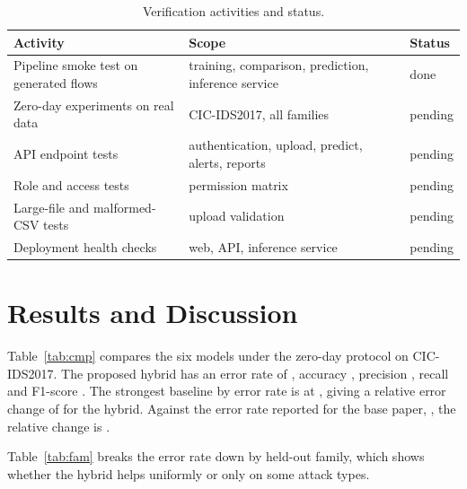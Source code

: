 \documentclass[conference]{IEEEtran}
\newcommand{\hybErr}{}\newcommand{\hybFscore}{}\newcommand{\hybPrec}{}\newcommand{\hybRec}{}\newcommand{\hybAcc}{}
\newcommand{\bestBaseName}{}\newcommand{\bestBaseErr}{}\newcommand{\relRedBase}{}\newcommand{\paperErr}{}\newcommand{\relRedPaper}{}
\begin{document}
\begin{table}[!htb]
\caption{Verification activities and status.}
\label{tab:test}
\centering\footnotesize
\begin{tabular}{@{}p{3.3cm}p{2.2cm}p{1.6cm}@{}}
\hline
Activity & Scope & Status \\
\hline
Pipeline smoke test on generated flows & training, comparison, prediction, inference service & done \\
Zero-day experiments on real data & CIC-IDS2017, all families & pending \\
API endpoint tests & authentication, upload, predict, alerts, reports & pending \\
Role and access tests & permission matrix & pending \\
Large-file and malformed-CSV tests & upload validation & pending \\
Deployment health checks & web, API, inference service & pending \\
\hline
\end{tabular}
\end{table}

\section{Results and Discussion}
Table~\ref{tab:cmp} compares the six models under the zero-day protocol on CIC-IDS2017. The proposed hybrid has an error rate of \hybErr{}, accuracy \hybAcc{}, precision \hybPrec{}, recall \hybRec{} and F1-score \hybFscore{}. The strongest baseline by error rate is \bestBaseName{} at \bestBaseErr{}, giving a relative error change of \relRedBase{} for the hybrid. Against the error rate reported for the base paper, \paperErr{}, the relative change is \relRedPaper{}.

\begin{table}[!htb]
\caption{Zero-day comparison on CIC-IDS2017 (mean over held-out attack families; best value in bold).}
\label{tab:cmp}
\centering\footnotesize

\end{table}

Table~\ref{tab:fam} breaks the error rate down by held-out family, which shows whether the hybrid helps uniformly or only on some attack types.

\begin{table}[!htb]
\caption{Error rate by held-out attack family on CIC-IDS2017 (best per column in bold).}
\label{tab:fam}
\centering\scriptsize
\resizebox{\columnwidth}{!}{}
\end{table}
\end{document}
